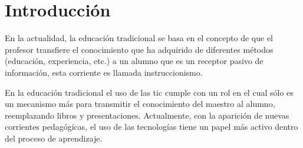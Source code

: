 \chapter{Introducción}
\label{chap:introduccion}




En la actualidad, la educación tradicional se basa en el
concepto de que el profesor transfiere el conocimiento que ha adquirido de
diferentes métodos (educación, experiencia, etc.) a un alumno que es un receptor
pasivo de información, esta corriente es llamada instruccionismo\cite{laptop:instructionism}. 

En la educación tradicional el uso de las \Gls{tic} cumple con
un rol en el cual sólo es un mecanismo más para transmitir el conocimiento del
maestro al alumno, reemplazando libros y presentaciones. Actualmente, con la 
aparición de nuevas corrientes pedagógicas, el uso de las tecnologías tiene un 
papel más activo dentro del proceso de aprendizaje.

